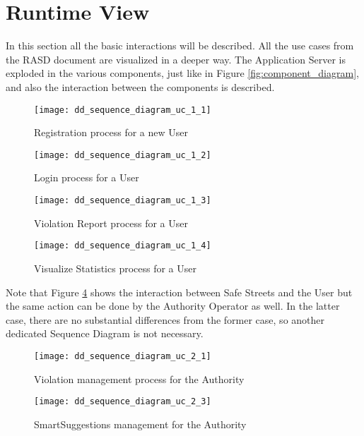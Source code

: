 \section{Runtime View}
In this section all the basic interactions will be described. All the use cases
from the RASD document are visualized in a deeper way. The Application Server is
exploded in the various components, just like in Figure
\ref{fig:component_diagram}, and also the interaction between the components is
described.

\begin{figure}[h]
    \centering
    \texttt{[image: dd\_sequence\_diagram\_uc\_1\_1]}
    \caption{Registration process for a new User}
    \label{fig:dd_sequence_diagram_uc_1_1}
\end{figure}

\begin{figure}[h]
    \centering
    \texttt{[image: dd\_sequence\_diagram\_uc\_1\_2]}
    \caption{Login process for a User}
    \label{fig:dd_sequence_diagram_uc_1_2}
\end{figure}

\begin{figure}[h]
    \centering
    \texttt{[image: dd\_sequence\_diagram\_uc\_1\_3]}
    \caption{Violation Report process for a User}
    \label{fig:dd_sequence_diagram_uc_1_3}
\end{figure}

\begin{figure}[ht]
    \centering
    \texttt{[image: dd\_sequence\_diagram\_uc\_1\_4]}
    \caption{Visualize Statistics process for a User}
    \label{fig:dd_sequence_diagram_uc_1_4}
\end{figure}

Note that Figure \ref{fig:dd_sequence_diagram_uc_1_4} shows the interaction
between Safe Streets and the User but the same action can be done by the
Authority Operator as well. In the latter case, there are no substantial
differences from the former case, so another dedicated Sequence Diagram is not
necessary.

\begin{figure}[h]
    \centering
    \texttt{[image: dd\_sequence\_diagram\_uc\_2\_1]}
    \caption{Violation management process for the Authority}
    \label{fig:dd_sequence_diagram_uc_2_1}
\end{figure}

\begin{figure}[h]
    \centering
    \texttt{[image: dd\_sequence\_diagram\_uc\_2\_3]}
    \caption{SmartSuggestions management for the Authority}
    \label{fig:dd_sequence_diagram_uc_2_3}
\end{figure}

